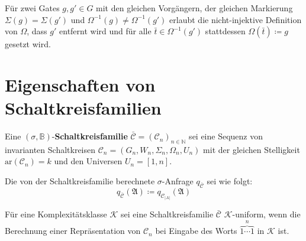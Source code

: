 Für zwei Gates $g,g'\in G$ mit den gleichen Vorgängern, der gleichen
Markierung $\Sigma\left(g\right)=\Sigma\left(g'\right)$ und $\Omega^{-1}\left(g\right)\neq\Omega^{-1}\left(g'\right)$
erlaubt die nicht-injektive Definition von $\Omega$, dass $g'$ entfernt
wird und für alle $\bar{t}\in\Omega^{-1}\left(g'\right)$ stattdessen
$\Omega\left(\bar{t}\right)\coloneqq g$ gesetzt wird.

\section{Eigenschaften von Schaltkreisfamilien}
\begin{defn}
Eine $\left(\sigma,\mathbb{B}\right)$-\textbf{Schaltkreisfamilie}
$\bar{\mathcal{C}}=\left(\mathcal{C}_{n}\right)_{n\in\mathbb{N}}$
sei eine Sequenz von invarianten Schaltkreisen $\mathcal{C}_{n}=\left(G_{n},W_{n},\Sigma_{n},\Omega_{n},U_{n}\right)$
mit der gleichen Stelligkeit $\mathrm{ar}\left(\mathcal{C}_{n}\right)=k$
und den Universen $U_{n}=\left[1,n\right]$.

Die von der Schaltkreisfamilie berechnete $\sigma$-Anfrage $q_{\bar{\mathcal{C}}}$
sei wie folgt: 
\[
q_{\bar{\mathcal{C}}}\left(\mathfrak{A}\right)\coloneqq q_{\mathcal{C}_{\left|A\right|}}\left(\mathfrak{A}\right)
\]
\end{defn}

\begin{defn}
Für eine Komplexitätsklasse $\mathcal{K}$ sei eine Schaltkreisfamilie
$\bar{\mathcal{C}}$ $\mathcal{K}$-uniform, wenn die Berechnung einer
Repräsentation von $\mathcal{C}_{n}$ bei Eingabe des Worts $\overset{n}{\overbrace{1\cdots1}}$
in $\mathcal{K}$ ist.
\end{defn}

